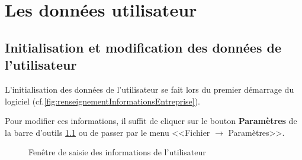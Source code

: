 \chapter{Les données utilisateur}
\section{Initialisation et modification des données de l'utilisateur}
L'initialisation des données de l'utilisateur se fait lors du premier démarrage du logiciel (cf.\ref{fig:renseignementInformationsEntreprise}).

Pour modifier ces informations, il suffit de cliquer sur le bouton \textbf{Paramètres} de la barre d'outils \ref{fig:modifierUtilisateur} ou de passer par le menu <<Fichier $\rightarrow$ Paramètres>>. 

\begin{figure}[H]
	\centering
	\caption{Fenêtre de saisie des informations de l'utilisateur}
	\label{fig:modifierUtilisateur}
\end{figure}